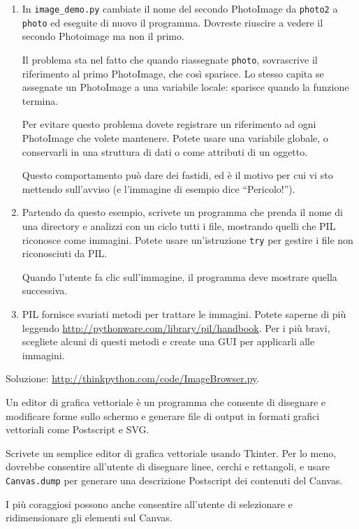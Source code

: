 \documentclass[10pt]{book}
\begin{document}
\begin{exercise}
\begin{enumerate}
\item In \verb"image_demo.py" cambiate il nome del secondo
PhotoImage da {\tt photo2} a {\tt photo} ed eseguite di nuovo il programma. Dovreste riuscire a vedere il secondo Photoimage ma non il primo.

Il problema sta nel fatto che quando riassegnate {\tt photo}, sovrascrive il riferimento al primo PhotoImage, che così sparisce. Lo stesso capita se assegnate un PhotoImage a una variabile locale: sparisce quando la funzione termina.

Per evitare questo problema dovete registrare un riferimento ad ogni
PhotoImage che volete mantenere. Potete usare una variabile globale, o conservarli in una struttura di dati o come attributi di un oggetto.

Questo comportamento può dare dei fastidi, ed è il motivo per cui vi sto mettendo sull'avviso (e l'immagine di esempio dice ``Pericolo!'').

\item Partendo da questo esempio, scrivete un programma che prenda il nome di una directory e analizzi con un ciclo tutti i file, mostrando quelli che PIL riconosce come immagini. Potete usare un'istruzione {\tt try}
per gestire i file non riconosciuti da PIL. 

Quando l'utente fa clic sull'immagine, il programma deve mostrare quella successiva.

\item PIL fornisce svariati metodi per trattare le immagini. Potete saperne di più leggendo \url{http://pythonware.com/library/pil/handbook}.
Per i più bravi, scegliete alcuni di questi metodi e create una GUI per applicarli alle immagini.

\end{enumerate}

Soluzione: \url{http://thinkpython.com/code/ImageBrowser.py}.

\end{exercise}

\vspace{0.2in}
\begin{exercise}

Un editor di grafica vettoriale è un programma che consente di disegnare e modificare forme sullo schermo e generare file di output in formati grafici vettoriali come Postscript e SVG.

Scrivete un semplice editor di grafica vettoriale usando Tkinter. Per lo meno, dovrebbe consentire all'utente di disegnare linee, cerchi e rettangoli, e usare {\tt Canvas.dump} per generare una descrizione Postscript dei contenuti del Canvas.

I più coraggiosi possono anche consentire all'utente di selezionare e ridimensionare gli elementi sul Canvas.


\end{exercise}
\end{document}
